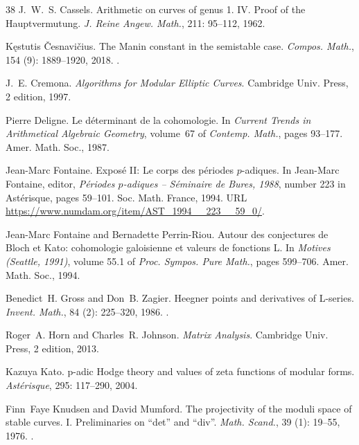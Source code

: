 \documentclass[11pt]{article}
\theoremstyle{definition}
\begin{document}
\begin{thebibliography}{38}
J.~W.~S. Cassels.
\newblock Arithmetic on curves of genus 1. {IV}. {Proof} of the {Hauptvermutung}.
\newblock \emph{J. Reine Angew. Math.}, 211: 95--112, 1962.

K{\k{e}}stutis {\v{C}}esnavi{\v{c}}ius.
\newblock The {Manin} constant in the semistable case.
\newblock \emph{Compos. Math.}, 154 (9): 1889--1920, 2018.
\newblock {}.

J.~E. Cremona.
\newblock \emph{Algorithms for Modular Elliptic Curves}.
\newblock Cambridge Univ. Press, 2 edition, 1997.

Pierre Deligne.
\newblock Le d\'eterminant de la cohomologie.
\newblock In \emph{Current Trends in Arithmetical Algebraic Geometry}, volume~67 of \emph{Contemp. Math.}, pages 93--177. Amer. Math. Soc., 1987.

Jean-Marc Fontaine.
\newblock Expos\'e {II}: Le corps des p\'eriodes {$p$}-adiques.
\newblock In Jean-Marc Fontaine, editor, \emph{P\'eriodes {$p$}-adiques -- S\'eminaire de {Bures}, 1988}, number 223 in Ast\'erisque, pages 59--101. Soc. Math. France, 1994.
\newblock URL \url{https://www.numdam.org/item/AST_1994__223__59_0/}.

Jean-Marc Fontaine and Bernadette Perrin-Riou.
\newblock Autour des conjectures de {Bloch} et {Kato}: cohomologie galoisienne et valeurs de fonctions {L}.
\newblock In \emph{Motives ({Seattle}, 1991)}, volume 55.1 of \emph{Proc. Sympos. Pure Math.}, pages 599--706. Amer. Math. Soc., 1994.

Benedict~H. Gross and Don~B. Zagier.
\newblock Heegner points and derivatives of {L}-series.
\newblock \emph{Invent. Math.}, 84 (2): 225--320, 1986.
\newblock {}.

Roger~A. Horn and Charles~R. Johnson.
\newblock \emph{Matrix Analysis}.
\newblock Cambridge Univ. Press, 2 edition, 2013.

Kazuya Kato.
\newblock p-adic {Hodge} theory and values of zeta functions of modular forms.
\newblock \emph{Ast\'erisque}, 295: 117--290, 2004.

Finn~Faye Knudsen and David Mumford.
\newblock The projectivity of the moduli space of stable curves. {I}. {Preliminaries} on ``det'' and ``div''.
\newblock \emph{Math. Scand.}, 39 (1): 19--55, 1976.
\newblock {}.


\end{thebibliography}
\end{document}
